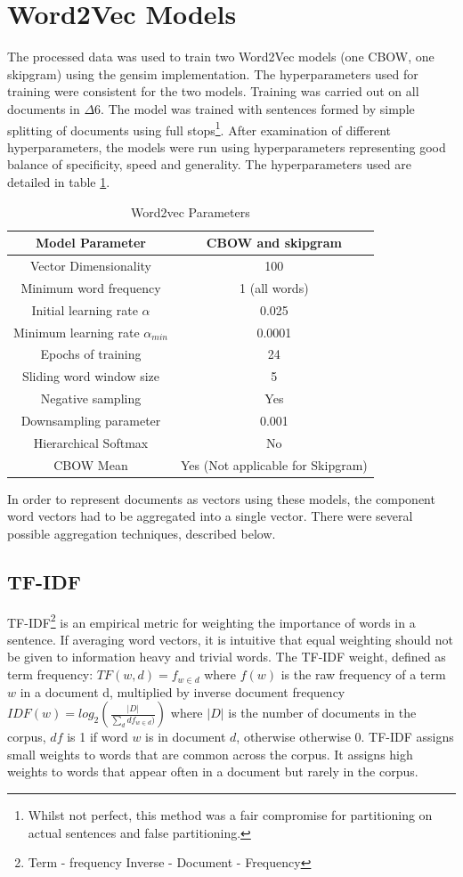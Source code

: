 \section{Word2Vec Models}
The processed data was used to train two Word2Vec models (one CBOW, one skipgram) using the gensim implementation\cite{gensim}. The hyperparameters used for training were consistent for the two models.
Training was carried out on all documents in $\Delta6$. The model was trained with sentences formed by simple splitting of documents using full stops\footnote{Whilst not perfect, this method was a fair compromise for partitioning on actual sentences and false partitioning.}. After examination of different hyperparameters, the models were run using hyperparameters representing good balance of specificity, speed and generality. The hyperparameters used are detailed in table \ref{tab:hyperparams}.
\begin{table}[H]
\begin{center}
\caption{Word2vec Parameters}
\label{tab:hyperparams}

\begin{tabular}{||c|c||}
\hline
Model Parameter &CBOW and skipgram\\
\hline
Vector Dimensionality & 100\\
Minimum word frequency & 1 (all words)\\
Initial learning rate $\alpha$ & 0.025 \\
Minimum learning rate $\alpha_{min}$&0.0001\\
Epochs of training & 24\\
Sliding word window size & 5\\
Negative sampling & Yes \\
Downsampling parameter & 0.001\\
Hierarchical Softmax & No\\
CBOW Mean & Yes (Not applicable for Skipgram) \\
\hline
\end{tabular}
\end{center}
\end{table}
In order to represent documents as vectors using these models, the component word vectors had to be aggregated into a single vector. There were several possible aggregation techniques, described below.
\subsection{TF-IDF}
TF-IDF\footnote{Term - frequency Inverse - Document - Frequency} is an empirical metric for weighting the importance of words in a sentence. If averaging word vectors, it is intuitive that equal weighting should not be given to information heavy and trivial words. The TF-IDF weight, defined as term frequency: $TF \left( w , d \right) = f_{ w \in d }$ where $f\left( w \right)$ is the raw frequency of a term $w$ in a document d,
multiplied by inverse document frequency $IDF(w) = log_{2} \left( \frac{|D|}{\sum_d df_{w \in d})} \right)$ where $|D|$ is the number of documents in the corpus, $df$ is 1 if word $w$ is in document $d$, otherwise otherwise 0\cite{gensim}.
TF-IDF assigns small weights to words that are common across the corpus. It assigns high weights to words that appear often in a document but rarely in the corpus.
